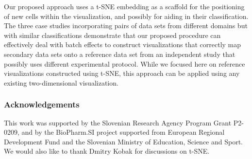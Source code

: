 \documentclass[runningheads]{llncs}
\begin{document}
Our proposed approach uses a t-SNE embedding as a scaffold for the positioning of
new cells within the visualization, and possibly for aiding in their
classification. The three case studies incorporating pairs of data sets from
different domains but with similar classifications demonstrate that our
proposed procedure can effectively deal with batch effects to construct
visualizations that correctly map secondary data sets onto a reference data
set from an independent study that possibly uses different experimental
protocol. While we focused here on reference visualizations constructed using t-SNE,
this approach can be applied using any existing two-dimensional visualization.

\subsubsection*{Acknowledgements}

This work was supported by the Slovenian Research Agency Program Grant P2-0209,
and by the BioPharm.SI project supported from European Regional Development
Fund and the Slovenian Ministry of Education, Science and Sport. We would also
like to thank Dmitry Kobak for discussions on t-SNE.

% 


\end{document}
